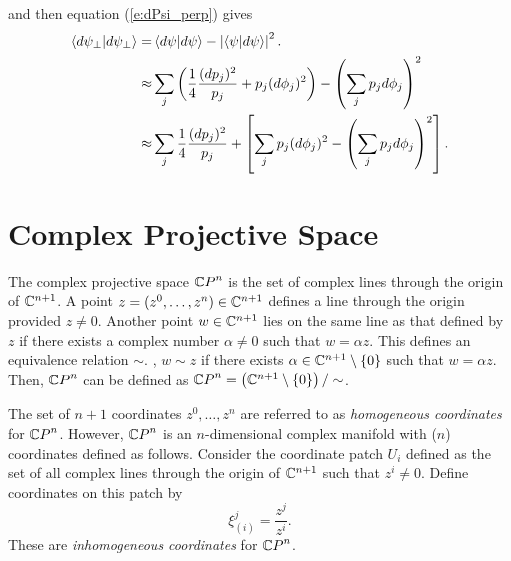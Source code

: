and then equation (\ref{e:dPsi_perp}) gives
\begin{equation}
\begin{split}
    {\langle{d\psi_\perp}|{d\psi_\perp}\rangle} 
        =&\, {\langle{d\psi}|{d\psi}\rangle} - \left| {\langle{\psi}|{d\psi}\rangle} \right|^2.\\
        \approx& \sum_j 
                    \left( 
                           \frac{1}{4}\frac{(dp_j)^2}{p_j}
                           +p_j(d\phi_j)^2
                    \right)
            - \left( \sum_jp_jd\phi_j \right)^2\\
        \approx& \sum_j \frac{1}{4}\frac{(dp_j)^2}{p_j}
                  + \left[ 
                           \sum_j p_j(d\phi_j)^2
                           - \left( \sum_jp_jd\phi_j \right)^2
                    \right].
\end{split}
\end{equation}


\section{Complex Projective Space}

The complex projective space ${\mathbb{C} P}^n$ is the set of complex lines
through the origin of ${\mathbb{C}}^{n+1}$.
A point $z=(z^0,\ldots,z^n)\in{\mathbb{C}}^{n+1}$ defines a line through
the origin provided $z\ne 0$.
Another point $w\in{\mathbb{C}}^{n+1}$ lies on the same line as that
defined by $z$ if there exists a complex number $\alpha\ne 0$
such that $w=\alpha z$.  This defines an equivalence relation $\sim$.
\ie, $w\sim z$ if there exists $\alpha\in{\mathbb{C}}^{n+1}\setminus\lbrace 0\rbrace$
such that $w=\alpha z$.  Then, ${\mathbb{C} P}^n$ can be defined as 
${\mathbb{C} P}^n=\left( {\mathbb{C}}^{n+1}\setminus\lbrace 0\rbrace\right)/\sim$.

The set of $n+1$ coordinates $z^0,\ldots,z^n$ are referred to as
\emph{homogeneous coordinates}
for ${\mathbb{C} P}^n$.  However, ${\mathbb{C} P}^n$ is an $n$-dimensional complex
manifold with ($n$) coordinates defined as follows.
Consider the coordinate patch $U_i$ defined as the set of all
complex lines through the origin of ${\mathbb{C}}^{n+1}$ such that $z^i\ne 0$.
Define coordinates on this patch by
\begin{equation}
\xi^j_{(i)} = \frac{z^j}{z^i}.
\end{equation}
These are \emph{inhomogeneous coordinates} for ${\mathbb{C} P}^n$.

